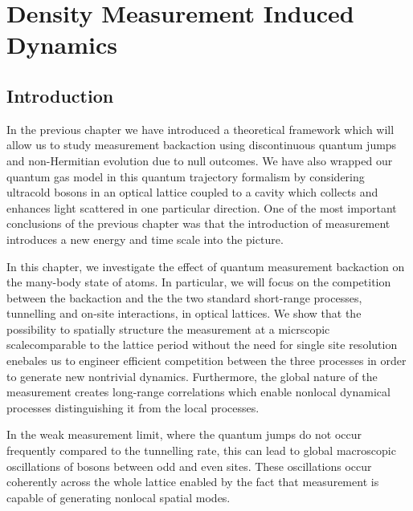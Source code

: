 
\chapter{Density Measurement Induced Dynamics}

\ifpdf
    \graphicspath{{Chapter5/Figs/Raster/}{Chapter5/Figs/PDF/}{Chapter5/Figs/}}
\else
    \graphicspath{{Chapter5/Figs/Vector/}{Chapter5/Figs/}}
\fi


\section{Introduction}

In the previous chapter we have introduced a theoretical framework
which will allow us to study measurement backaction using
discontinuous quantum jumps and non-Hermitian evolution due to null
outcomes. We have also wrapped our quantum gas model in this quantum
trajectory formalism by considering ultracold bosons in an optical
lattice coupled to a cavity which collects and enhances light
scattered in one particular direction. One of the most important
conclusions of the previous chapter was that the introduction of
measurement introduces a new energy and time scale into the picture.

In this chapter, we investigate the effect of quantum measurement
backaction on the many-body state of atoms. In particular, we will
focus on the competition between the backaction and the the two
standard short-range processes, tunnelling and on-site interactions,
in optical lattices. We show that the possibility to spatially
structure the measurement at a micrscopic scalecomparable to the
lattice period without the need for single site resolution enebales us
to engineer efficient competition between the three processes in order
to generate new nontrivial dynamics. Furthermore, the global nature of
the measurement creates long-range correlations which enable nonlocal
dynamical processes distinguishing it from the local processes.

In the weak measurement limit, where the quantum jumps do not occur
frequently compared to the tunnelling rate, this can lead to global
macroscopic oscillations of bosons between odd and even sites. These
oscillations occur coherently across the whole lattice enabled by the
fact that measurement is capable of generating nonlocal spatial modes.

